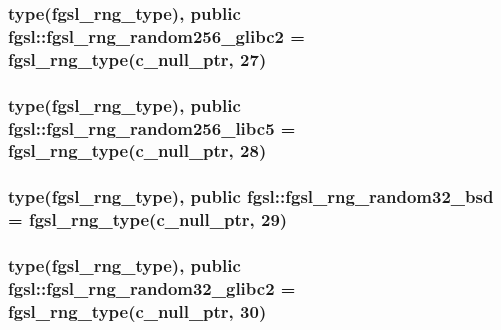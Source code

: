 \hypertarget{classfgsl_aca7a71613cf5e355ebfe501bd30a0062}{
\subsubsection[{fgsl\-\_\-rng\-\_\-random256\-\_\-glibc2}]{\setlength{\rightskip}{0pt plus 5cm}type({\bf fgsl\-\_\-rng\-\_\-type}), public fgsl\-::fgsl\-\_\-rng\-\_\-random256\-\_\-glibc2 = {\bf fgsl\-\_\-rng\-\_\-type}(c\-\_\-null\-\_\-ptr, 27)}}\label{classfgsl_aca7a71613cf5e355ebfe501bd30a0062}
\hypertarget{classfgsl_a07865f4f3a0cd07f3e922da1b3616e68}{
\subsubsection[{fgsl\-\_\-rng\-\_\-random256\-\_\-libc5}]{\setlength{\rightskip}{0pt plus 5cm}type({\bf fgsl\-\_\-rng\-\_\-type}), public fgsl\-::fgsl\-\_\-rng\-\_\-random256\-\_\-libc5 = {\bf fgsl\-\_\-rng\-\_\-type}(c\-\_\-null\-\_\-ptr, 28)}}\label{classfgsl_a07865f4f3a0cd07f3e922da1b3616e68}
\hypertarget{classfgsl_a1adf276b8f59b011e5a28451b9245a96}{
\subsubsection[{fgsl\-\_\-rng\-\_\-random32\-\_\-bsd}]{\setlength{\rightskip}{0pt plus 5cm}type({\bf fgsl\-\_\-rng\-\_\-type}), public fgsl\-::fgsl\-\_\-rng\-\_\-random32\-\_\-bsd = {\bf fgsl\-\_\-rng\-\_\-type}(c\-\_\-null\-\_\-ptr, 29)}}\label{classfgsl_a1adf276b8f59b011e5a28451b9245a96}
\hypertarget{classfgsl_a26cb9ca6b94f3b1db24cdc006f07196a}{
\subsubsection[{fgsl\-\_\-rng\-\_\-random32\-\_\-glibc2}]{\setlength{\rightskip}{0pt plus 5cm}type({\bf fgsl\-\_\-rng\-\_\-type}), public fgsl\-::fgsl\-\_\-rng\-\_\-random32\-\_\-glibc2 = {\bf fgsl\-\_\-rng\-\_\-type}(c\-\_\-null\-\_\-ptr, 30)}}\label{classfgsl_a26cb9ca6b94f3b1db24cdc006f07196a}
